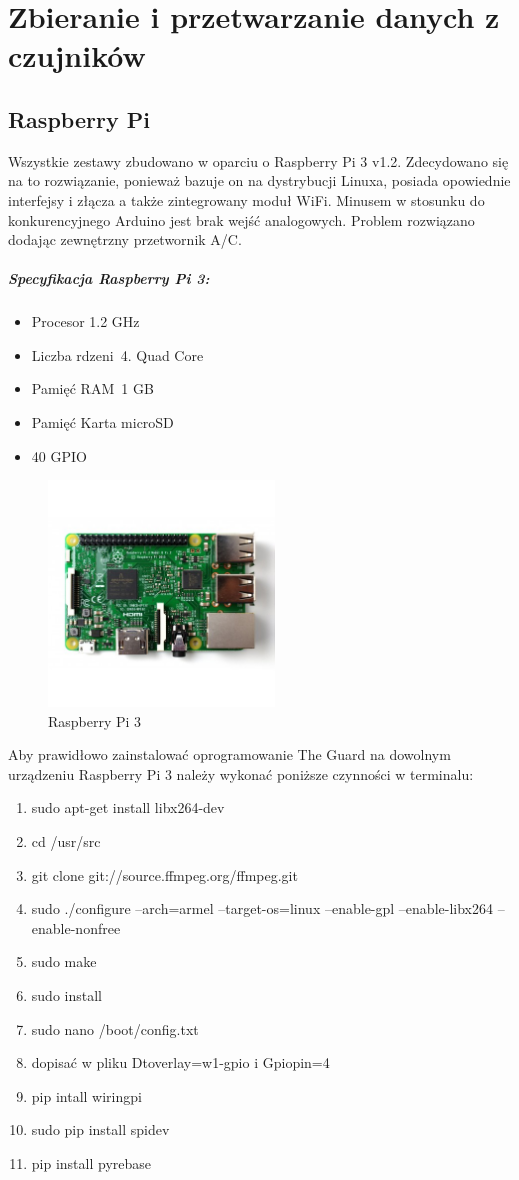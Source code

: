 \chapter{Zbieranie i przetwarzanie danych z czujników}

\section*{Raspberry Pi}

Wszystkie zestawy zbudowano w oparciu o Raspberry Pi 3 v1.2. Zdecydowano się na to rozwiązanie, ponieważ bazuje on na dystrybucji Linuxa, posiada opowiednie interfejsy i złącza a także zintegrowany moduł WiFi. Minusem w stosunku do konkurencyjnego Arduino jest brak wejść analogowych. Problem rozwiązano dodając zewnętrzny przetwornik A/C.
\paragraph{Specyfikacja Raspberry Pi 3:}
\begin{itemize} 
\item Procesor 1.2 GHz
\item Liczba rdzeni 4. Quad Core
\item Pamięć RAM 1 GB
\item Pamięć Karta microSD
\item 40 GPIO
\end{itemize}
\begin{figure}[h]
	\centering
	\includegraphics[width=6cm]{raspberry.jpg}
	\caption{Raspberry Pi 3}
\end{figure}
Aby prawidłowo zainstalować oprogramowanie The Guard na dowolnym urządzeniu Raspberry Pi 3 należy wykonać poniższe czynności w terminalu:
\begin{enumerate} 
\item sudo apt-get install libx264-dev
\item cd /usr/src
\item git clone git://source.ffmpeg.org/ffmpeg.git
\item sudo ./configure --arch=armel --target-os=linux --enable-gpl --enable-libx264 --enable-nonfree
\item sudo make
\item sudo install
\item sudo nano /boot/config.txt
\item dopisać w pliku Dtoverlay=w1-gpio i Gpiopin=4
\item pip intall wiringpi
\item sudo pip install spidev
\item pip install pyrebase
\end{enumerate}
